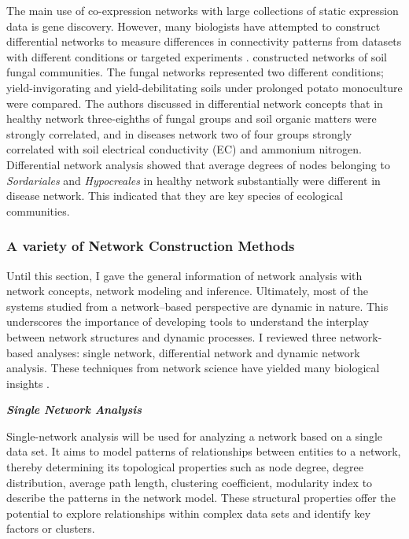 The main use of co-expression networks with large collections of static expression data is gene discovery. However, many biologists have attempted to construct differential networks to measure differences in connectivity patterns from datasets with different conditions or targeted experiments \citep{Toubiana:2013cv}. \citet{Lu:2013hga} constructed networks of soil fungal communities. The fungal networks represented two different conditions; yield-invigorating and yield-debilitating soils under prolonged potato monoculture were compared. The authors discussed in differential network concepts that in healthy network three-eighths of fungal groups and soil organic matters were strongly correlated, and in diseases network two of four groups strongly correlated with soil electrical conductivity (EC) and ammonium nitrogen. Differential network analysis showed that average degrees of nodes belonging to \textit{Sordariales} and \textit{Hypocreales} in healthy network substantially were different in disease network. This indicated that they are key species of ecological communities.

\subsubsection*{A variety of Network Construction Methods}

Until this section, I gave the general information of network analysis with network concepts, network modeling and inference. Ultimately, most of the systems studied from a network--based perspective are dynamic in nature. This underscores the importance of developing tools to understand the interplay between network structures and dynamic processes. I reviewed three network-based analyses: single network, differential network and dynamic network analysis. These techniques from network science have yielded many biological insights \citep{Idekerdiffnet}.

\textbf{\textit{Single Network Analysis}}

Single-network analysis will be used for analyzing a network based on a single data set. It aims to model patterns of relationships between entities to a network, thereby determining its topological properties such as node degree, degree distribution, average path length, clustering coefficient, modularity index \citep{newman2006modularity} to describe the patterns in the network model. These structural properties offer the potential to explore relationships within complex data sets and identify key factors or clusters.

